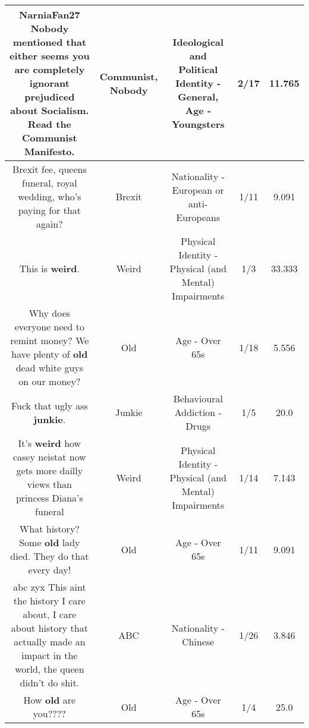 \documentclass[11pt]{article}
\newlength\mylength
\begin{document}
\begin{center}
\begin{longtable}{|C{.65\mylength}|C{.30\mylength}|C{.12\mylength}|C{.12\mylength}|C{.12\mylength}|}
  \small NarniaFan27 \textbf{Nobody} mentioned that either seems you are completely ignorant prejudiced about Socialism.  Read the \textbf{Communist} Manifesto.\normalsize   & Communist, Nobody &  Ideological and Political Identity - General, Age - Youngsters & 2/17 & 11.765 \\  \hline
  \small Brexit fee, queens funeral, royal wedding, who's paying for that again?\normalsize   & Brexit & Nationality - European or anti-Europeans & 1/11 & 9.091 \\  \hline
  \small This is \textbf{weird}.\normalsize   & Weird & Physical Identity - Physical (and Mental) Impairments & 1/3 & 33.333 \\  \hline
  \small Why does everyone need to remint money? We have plenty of \textbf{old} dead white guys on our money?\normalsize   & Old & Age - Over 65s & 1/18 & 5.556 \\  \hline
  \small Fuck that ugly ass \textbf{junkie}.\normalsize   & Junkie & Behavioural Addiction - Drugs & 1/5 & 20.0 \\  \hline
  \small It's \textbf{weird} how casey neistat now gets more dailly views than princess Diana's funeral\normalsize   & Weird & Physical Identity - Physical (and Mental) Impairments & 1/14 & 7.143 \\  \hline
  \small What history? Some \textbf{old} lady died. They do that every day!\normalsize   & Old & Age - Over 65s & 1/11 & 9.091 \\  \hline
  \small abc zyx This aint the history I care about, I care about history that actually made an impact in the world, the queen didn't do shit.\normalsize   & ABC & Nationality - Chinese & 1/26 & 3.846 \\  \hline
  \small How \textbf{old} are you????\normalsize   & Old & Age - Over 65s & 1/4 & 25.0 \\  \hline

\end{longtable}
\end{center}
\end{document}
